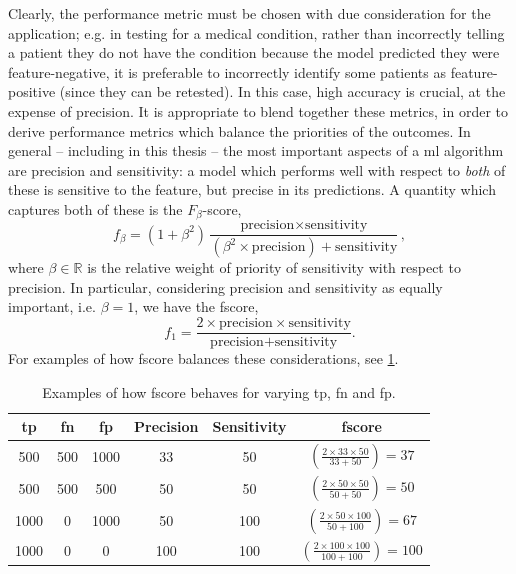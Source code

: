 Clearly, the performance metric must be chosen with due consideration for the application;
    e.g. in testing for a medical condition, rather than incorrectly telling a patient they do not have the condition because the 
    model predicted they were feature-negative, it is preferable to incorrectly identify some patients as feature-positive (since they can be retested). 
In this case, high accuracy is crucial, at the expense of precision. 
It is appropriate to blend together these metrics, in order to derive performance metrics which balance the priorities of the outcomes.
In general -- including in this thesis -- the most important aspects of a \gls{ml} algorithm are precision and sensitivity: 
    a model which performs well with respect to \emph{both} of these is sensitive to the feature, but precise in its predictions. 
A quantity which captures both of these is the $F_{\beta}$-score, 
\begin{equation}\label{eqn:f_beta}
    f_{\beta} = \left( 1 + \beta^2 \right) \frac{
        \textrm{precision} \times \textrm{sensitivity} }{
        \left(\beta^2\times\textrm{precision}\right) + \textrm{sensitivity}},
\end{equation}
where $\beta \in \mathbb{R}$ is the relative weight of priority of sensitivity with respect to precision. 
In particular, considering precision and sensitivity as equally important, i.e. $\beta=1$, 
    we have the \gls{fscore}, 
\begin{equation}
    \label{eqn:f_score_def}
    f_1 = \frac{2 \times \textrm{precision} \times \textrm{sensitivity} }{\textrm{precision} + \textrm{sensitivity}}.
\end{equation}
For examples of how \gls{fscore} balances these considerations, see \cref{table:f1_example}.
\par

\begin{table}[t]
    \centering
    \begin{tabular}{|ccc|cc|c|}
        \hline
        \Acrlong{tp} & \Acrlong{fn} & \Acrlong{fp} & Precision & Sensitivity & \gls{fscore}  \\
        \hline
        \rule{0pt}{3ex} 500 & 500 & 1000 & 33 & 50 & $ (\frac{2 \times 33 \times 50 }{33 + 50 }) = 37 $ \\
        \rule{0pt}{3ex} 500 & 500 & 500 & 50 & 50 & $( \frac{2 \times 50 \times 50 }{50 + 50 } ) = 50 $ \\
        \rule{0pt}{3ex} 1000 & 0 & 1000 & 50 & 100 & $ (\frac{2 \times 50 \times 100} { 50 + 100 }) = 67 $ \\
        \rule{0pt}{3ex} 1000  & 0 & 0 & 100 & 100 & $ (\frac{2 \times 100 \times 100}{100 + 100}) = 100 $ \\
        \hline
    \end{tabular}
    \caption[$F_1$-score examples]{
        Examples of how \gls{fscore} behaves for varying \acrlong{tp}, \acrlong{fn} and \acrlong{fp}. 
    }
    \label{table:f1_example}
\end{table}


